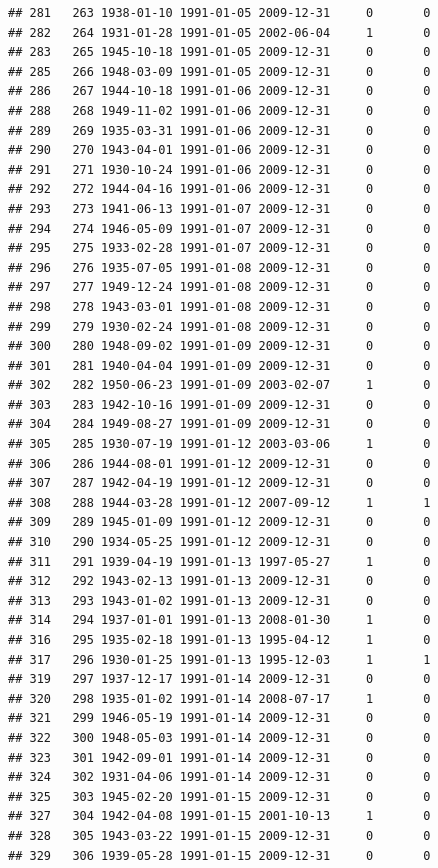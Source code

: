 \documentclass[
]{book}
\theoremstyle{definition}
\theoremstyle{definition}
\theoremstyle{definition}
\theoremstyle{definition}
\theoremstyle{remark}
\begin{document}
\begin{verbatim}
## 281   263 1938-01-10 1991-01-05 2009-12-31     0       0
## 282   264 1931-01-28 1991-01-05 2002-06-04     1       0
## 283   265 1945-10-18 1991-01-05 2009-12-31     0       0
## 285   266 1948-03-09 1991-01-05 2009-12-31     0       0
## 286   267 1944-10-18 1991-01-06 2009-12-31     0       0
## 288   268 1949-11-02 1991-01-06 2009-12-31     0       0
## 289   269 1935-03-31 1991-01-06 2009-12-31     0       0
## 290   270 1943-04-01 1991-01-06 2009-12-31     0       0
## 291   271 1930-10-24 1991-01-06 2009-12-31     0       0
## 292   272 1944-04-16 1991-01-06 2009-12-31     0       0
## 293   273 1941-06-13 1991-01-07 2009-12-31     0       0
## 294   274 1946-05-09 1991-01-07 2009-12-31     0       0
## 295   275 1933-02-28 1991-01-07 2009-12-31     0       0
## 296   276 1935-07-05 1991-01-08 2009-12-31     0       0
## 297   277 1949-12-24 1991-01-08 2009-12-31     0       0
## 298   278 1943-03-01 1991-01-08 2009-12-31     0       0
## 299   279 1930-02-24 1991-01-08 2009-12-31     0       0
## 300   280 1948-09-02 1991-01-09 2009-12-31     0       0
## 301   281 1940-04-04 1991-01-09 2009-12-31     0       0
## 302   282 1950-06-23 1991-01-09 2003-02-07     1       0
## 303   283 1942-10-16 1991-01-09 2009-12-31     0       0
## 304   284 1949-08-27 1991-01-09 2009-12-31     0       0
## 305   285 1930-07-19 1991-01-12 2003-03-06     1       0
## 306   286 1944-08-01 1991-01-12 2009-12-31     0       0
## 307   287 1942-04-19 1991-01-12 2009-12-31     0       0
## 308   288 1944-03-28 1991-01-12 2007-09-12     1       1
## 309   289 1945-01-09 1991-01-12 2009-12-31     0       0
## 310   290 1934-05-25 1991-01-12 2009-12-31     0       0
## 311   291 1939-04-19 1991-01-13 1997-05-27     1       0
## 312   292 1943-02-13 1991-01-13 2009-12-31     0       0
## 313   293 1943-01-02 1991-01-13 2009-12-31     0       0
## 314   294 1937-01-01 1991-01-13 2008-01-30     1       0
## 316   295 1935-02-18 1991-01-13 1995-04-12     1       0
## 317   296 1930-01-25 1991-01-13 1995-12-03     1       1
## 319   297 1937-12-17 1991-01-14 2009-12-31     0       0
## 320   298 1935-01-02 1991-01-14 2008-07-17     1       0
## 321   299 1946-05-19 1991-01-14 2009-12-31     0       0
## 322   300 1948-05-03 1991-01-14 2009-12-31     0       0
## 323   301 1942-09-01 1991-01-14 2009-12-31     0       0
## 324   302 1931-04-06 1991-01-14 2009-12-31     0       0
## 325   303 1945-02-20 1991-01-15 2009-12-31     0       0
## 327   304 1942-04-08 1991-01-15 2001-10-13     1       0
## 328   305 1943-03-22 1991-01-15 2009-12-31     0       0
## 329   306 1939-05-28 1991-01-15 2009-12-31     0       0

\end{verbatim}
\end{document}
